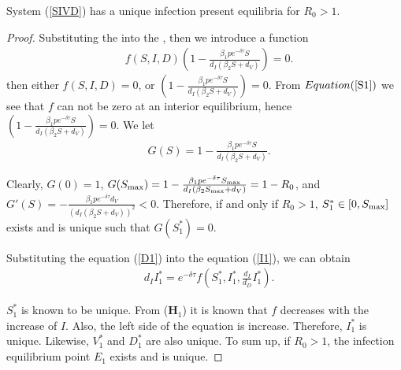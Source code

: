 \documentclass{CMHPhD-SIVD}
\begin{document}
\begin{lemma}
	System (\ref{SIVD}) has a unique infection present equilibria for $R_0>1$.
\end{lemma}
\begin{proof}
Substituting the  into the , then we introduce a function
\begin{align}\label{41}
&f(S, I, D)\left(1-\frac{\beta_1 p e^{-\delta\tau} S}{d_I(\beta_2 S+d_V)}\right)=0.
\end{align}
then either $f(S, I, D)=0$, or $\left(1-\frac{\beta_1 p e^{-\delta\tau} S}{d_I(\beta_2 S+d_V)}\right)=0$.  
From $\eqn{S1}$ we see that $f$ can not be zero at an interior equilibrium, hence
$\left(1-\frac{\beta_1 p e^{-\delta\tau} S}{d_I(\beta_2 S+d_V)}\right)=0$. We let
\begin{align*}
&G(S)=1-\frac{\beta_1 p e^{-\delta\tau} S}{d_I(\beta_2 S+d_V)}.
\end{align*}

Clearly, $G(0)=1$, $G(S_{\text{max}})=1-\frac{\beta_1 p e^{-\delta\tau} S_{\text{max}}}{d_I(\beta_2 S_{\text{max}}+d_V)}=1-R_0$, and $G'(S)=-\frac{\beta_1 p e^{-\delta\tau} d_V}{(d_I(\beta_2 S+d_V))^2}<0$. Therefore, if and only if $R_0>1$, $S_1^*\in[0, S_{\text{max}}]$ exists and is unique such that $G(S_1^*)=0.$

Substituting the equation (\ref{D1}) into the equation (\ref{I1}), we can obtain
\begin{align*}
&d_I I_1^*=e^{-\delta\tau}f(S_1^*, I_1^*, \frac{d_I}{d_D}I_1^*).
\end{align*}

$S_1^*$ is known to be unique. From ($\mathbf{H}_1$) it is known that $f$ decreases with the increase of $I$. Also, the left side of the equation is increase. Therefore, $I_1^*$ is unique. Likewise, $V_1^*$ and $D_1^*$ are also unique. To sum up, if $R_0>1$, the infection equilibrium point $E_1$ exists and is unique.
\end{proof}

%
\end{document}
